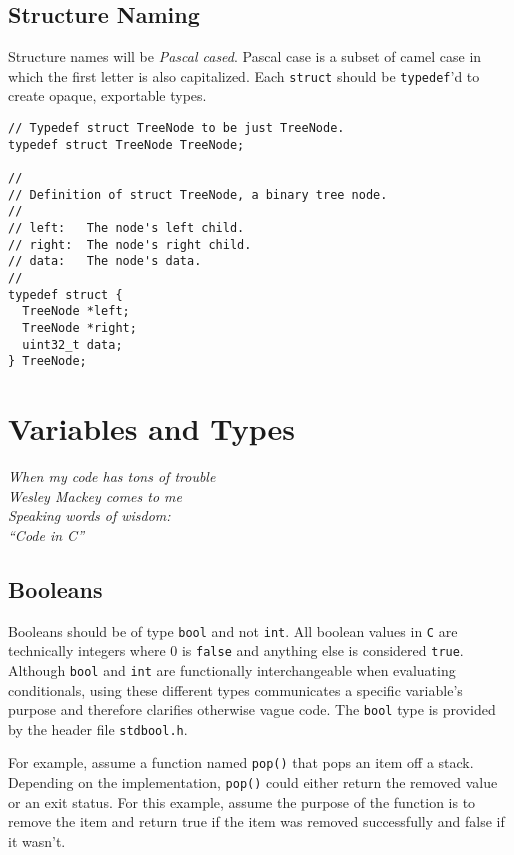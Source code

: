 \documentclass[11pt]{article}
\begin{document}
\subsection{Structure Naming}
Structure names will be \emph{Pascal cased}. Pascal case is a subset
of camel case in which the first letter is also capitalized. Each \texttt{struct}
should be \texttt{typedef}'d to create opaque, exportable types.

\begin{lstlisting}
// Typedef struct TreeNode to be just TreeNode.
typedef struct TreeNode TreeNode;

//
// Definition of struct TreeNode, a binary tree node.
//
// left:   The node's left child.
// right:  The node's right child.
// data:   The node's data.
//
typedef struct {
  TreeNode *left;
  TreeNode *right;
  uint32_t data;
} TreeNode;
\end{lstlisting}

\section{Variables and Types}

\textwidth
\epigraph{\emph{When my code has tons of trouble\\ Wesley Mackey comes to me\\
Speaking words of wisdom: \\ ``Code in C''}}{}

\subsection{Booleans}
\noindent Booleans should be of type \texttt{bool} and not \texttt{int}.
All boolean values in \texttt{C} are technically integers where $0$ is
\texttt{false} and anything else is considered \texttt{true}. Although \texttt{bool}
and \texttt{int} are functionally interchangeable when evaluating conditionals, using these
different types communicates a specific variable's purpose and therefore clarifies
otherwise vague code. The \texttt{bool} type is provided by the header file \texttt{stdbool.h}.

For example, assume a function named \texttt{pop()} that pops
an item off a stack. Depending on the implementation, \texttt{pop()} could
either return the removed value or an exit status. For this example, assume the
purpose of the function is to remove the item and return true if the item was
removed successfully and false if it wasn't.
\end{document}
